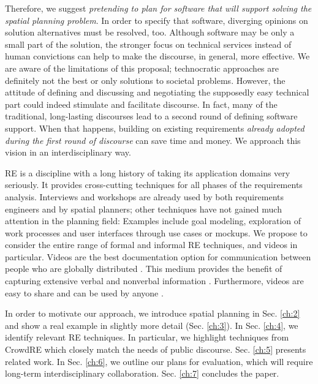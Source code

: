 \documentclass[conference]{IEEEtran}
\begin{document}
Therefore, we suggest \textit{pretending to plan for software that will support 
solving the spatial planning problem}. In order to specify that software, 
diverging opinions on solution alternatives must be resolved, too. Although 
software may be only a small part of the solution, the stronger focus on 
technical services instead of human convictions can help to make the discourse, 
in general, more effective. We are aware of the limitations of this proposal; 
technocratic approaches are definitely not the best or only solutions to 
societal problems. However, the attitude of defining and discussing and 
negotiating the supposedly easy technical part could indeed stimulate and 
facilitate discourse. In fact, many of the traditional, long-lasting discourses 
lead to a second round of defining software support. When that happens, 
building on existing requirements \textit{already adopted during the first 
round of discourse} can save time and money. We approach this vision 
in an interdisciplinary way.

RE is a discipline with a long history of taking its application domains very 
seriously. It provides cross-cutting techniques for all phases of the  
requirements analysis. Interviews and workshops are already used by both 
requirements engineers and by spatial planners; other techniques have not 
gained much attention in the planning field: Examples include goal modeling, 
exploration of work processes and user interfaces through use cases or mockups. 
We propose to consider the entire range of formal and informal RE techniques, 
and videos in particular. Videos are the best documentation option for 
communication between people who are globally distributed \cite{Ambler.2002}. 
This medium provides the benefit of capturing extensive verbal and nonverbal 
information \cite{Karras.2016b}. Furthermore, videos are easy to share and can 
be used by anyone \cite{Karras.2017}.

In order to motivate our approach, we introduce spatial planning in 
Sec. \ref{ch:2} and show a real example in slightly more detail (Sec. 
\ref{ch:3}). In Sec. \ref{ch:4}, we identify relevant RE techniques. In 
particular, we highlight techniques from CrowdRE which closely match the needs 
of public discourse. Sec. \ref{ch:5} presents related work. In Sec. \ref{ch:6}, 
we outline our plans for evaluation, which will require long-term 
interdisciplinary collaboration. Sec. \ref{ch:7} concludes the paper.
\end{document}
